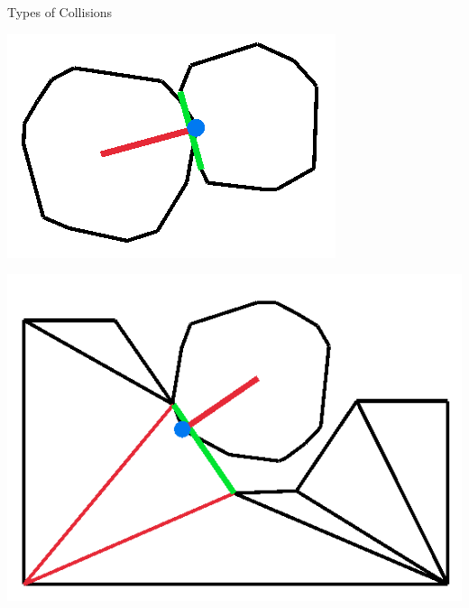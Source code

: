 \begin{frame}{Types of Collisions}
    \begin{minipage}{\textwidth}
        \centering
        \begin{minipage}{0.24\textwidth}
            \centering
            \includegraphics[width=\textwidth]{figures/colls/rrw.png}
        \end{minipage}
        \begin{minipage}{0.24\textwidth}
            \centering
            \includegraphics[width=\textwidth]{figures/colls/rtw.png}
        \end{minipage}
        \begin{minipage}{0.24\textwidth}
            \centering

\end{minipage}
\end{minipage}
\end{frame}
